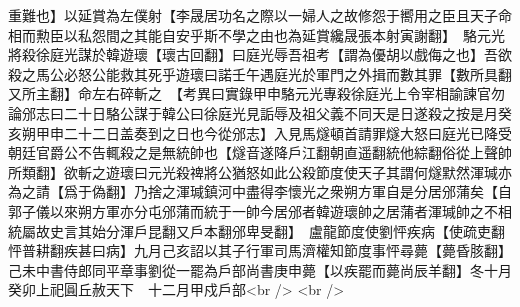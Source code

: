 重難也】以延賞為左僕射【李晟居功名之際以一婦人之故修怨于嚮用之臣且天子命相而勲臣以私怨間之其能自安乎斯不學之由也為延賞纔晟張本射寅謝翻】　駱元光將殺徐庭光謀於韓遊瓌【瓌古回翻】曰庭光辱吾祖考【謂為優胡以戲侮之也】吾欲殺之馬公必怒公能救其死乎遊瓌曰諾壬午遇庭光於軍門之外揖而數其罪【數所具翻又所主翻】命左右碎斬之　【考異曰實錄甲申駱元光專殺徐庭光上令宰相諭諫官勿論邠志曰二十日駱公謀于韓公曰徐庭光見詬辱及祖父義不同天是日遂殺之按是月癸亥朔甲申二十二日盖奏到之日也今從邠志】入見馬燧頓首請罪燧大怒曰庭光已降受朝廷官爵公不告輒殺之是無統帥也【燧音遂降戶江翻朝直遥翻統他綜翻俗從上聲帥所類翻】欲斬之遊瓌曰元光殺禆將公猶怒如此公殺節度使天子其謂何燧默然渾瑊亦為之請【爲于偽翻】乃捨之渾瑊鎮河中盡得李懷光之衆朔方軍自是分居邠蒲矣【自郭子儀以來朔方軍亦分屯邠蒲而統于一帥今居邠者韓遊瓌帥之居蒲者渾瑊帥之不相統屬故史言其始分渾戶昆翻又戶本翻邠卑旻翻】　盧龍節度使劉怦疾病【使疏吏翻怦普耕翻疾甚曰病】九月己亥詔以其子行軍司馬濟權知節度事怦尋薨【薨昏胲翻】　己未中書侍郎同平章事劉從一罷為戶部尚書庚申薨【以疾罷而薨尚辰羊翻】冬十月癸卯上祀圓丘赦天下　十二月甲戍戶部<br />
<br />
